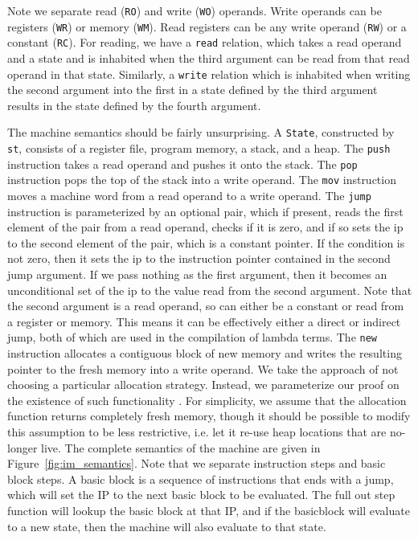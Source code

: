 Note we separate read (\texttt{RO}) and write (\texttt{WO}) operands. Write
operands can be registers (\texttt{WR}) or memory (\texttt{WM}). Read registers
can be any write operand (\texttt{RW}) or a constant (\texttt{RC}). For reading,
we have a \texttt{read} relation, which takes a read operand and a state and is
inhabited when the third argument can be read from that read operand in that
state. Similarly, a \texttt{write} relation which is inhabited when writing the
second argument into the first in a state defined by the third argument results
in the state defined by the fourth argument.  

The machine semantics should be fairly unsurprising. A \texttt{State},
constructed by \texttt{st}, consists of a register file, program memory, a
stack, and a heap. The \texttt{push} instruction takes a read operand and pushes
it onto the stack. The \texttt{pop} instruction pops the top of the stack into a
write operand. The \texttt{mov} instruction moves a machine word from a read
operand to a write operand. The \texttt{jump} instruction is parameterized by an
optional pair, which if present, reads the first element of the pair from a read
operand, checks if it is zero, and if so sets the ip to the second element of
the pair, which is a constant pointer. If the condition is not zero, then it
sets the ip to the instruction pointer contained in the second jump argument. If
we pass nothing as the first argument, then it becomes an unconditional set of
the ip to the value read from the second argument.  Note that the second
argument is a read operand, so can either be a constant or read from a register
or memory. This means it can be effectively either a direct or indirect jump,
both of which are used in the compilation of lambda terms. The \texttt{new}
instruction allocates a contiguous block of new memory and writes the resulting
pointer to the fresh memory into a write operand. We take the approach of not
choosing a particular allocation strategy. Instead, we parameterize our proof on
the existence of such functionality \cite{chlipala}. For simplicity, we assume
that the allocation function returns completely fresh memory, though it should
be possible to modify this assumption to be less restrictive, i.e. let it re-use
heap locations that are no-longer live. The complete semantics of the machine
are given in Figure~\ref{fig:im_semantics}. Note that we separate instruction steps
and basic block steps. A basic block is a sequence of instructions that ends
with a jump, which will set the IP to the next basic block to be evaluated. The
full out step function will lookup the basic block at that IP, and if the
basicblock will evaluate to a new state, then the machine will also evaluate to
that state. 

